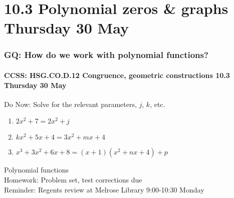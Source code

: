 \documentclass{beamer}
\begin{document}
  \section{10.3 Polynomial zeros \& graphs Thursday 30 May}
    \frame
    {
      \frametitle{GQ: How do we work with polynomial functions?}
      \framesubtitle{CCSS: HSG.CO.D.12 Congruence, geometric constructions \hfill \alert{10.3 Thursday 30 May}}

      \begin{block}{Do Now: Solve for the relevant parameters, $j$, $k$, etc.}
        \begin{enumerate}
          \item $2x^2+7=2x^2+j$
          \item $kx^2+5x+4=3x^2+mx+4$
          \item $x^3+3x^2+6x+8=(x+1)(x^2+nx+4)+p$
        \end{enumerate}
      \end{block}
      Polynomial functions\\[0.25cm]
      Homework: Problem set, test corrections due\\
      Reminder: Regents review at Melrose Library 9:00-10:30 Monday
    }
\end{document}
